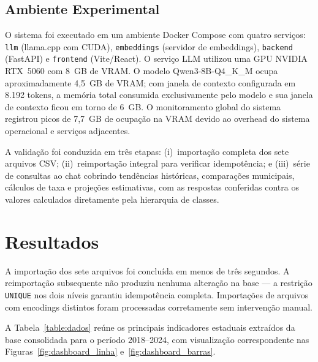 \documentclass[preprint,10pt,5p]{elsarticle}
\begin{document}
\subsection{Ambiente Experimental}

O sistema foi executado em um ambiente Docker Compose com quatro serviços: \texttt{llm}
(llama.cpp com CUDA), \texttt{embeddings} (servidor de embeddings), \texttt{backend}
(FastAPI) e \texttt{frontend} (Vite/React). O serviço LLM utilizou uma GPU NVIDIA RTX~5060
com 8~GB de VRAM. O modelo Qwen3-8B-Q4\_K\_M ocupa aproximadamente 4,5~GB de VRAM; com
janela de contexto configurada em 8.192 tokens, a memória total consumida exclusivamente
pelo modelo e sua janela de contexto ficou em torno de 6~GB. O monitoramento global do
sistema registrou picos de 7,7~GB de ocupação na VRAM devido ao overhead do sistema
operacional e serviços adjacentes.

A validação foi conduzida em três etapas: (i)~importação completa dos sete arquivos CSV;
(ii)~reimportação integral para verificar idempotência; e (iii)~série de consultas ao chat
cobrindo tendências históricas, comparações municipais, cálculos de taxa e projeções
estimativas, com as respostas conferidas contra os valores calculados diretamente pela
hierarquia de classes.


\section{Resultados}
\label{results}

A importação dos sete arquivos foi concluída em menos de três segundos. A reimportação
subsequente não produziu nenhuma alteração na base — a restrição \texttt{UNIQUE} nos dois
níveis garantiu idempotência completa. Importações de arquivos com encodings distintos foram
processadas corretamente sem intervenção manual.

A Tabela~\ref{table:dados} reúne os principais indicadores estaduais extraídos da base
consolidada para o período 2018--2024, com visualização correspondente nas
Figuras~\ref{fig:dashboard_linha} e~\ref{fig:dashboard_barras}.
\end{document}
